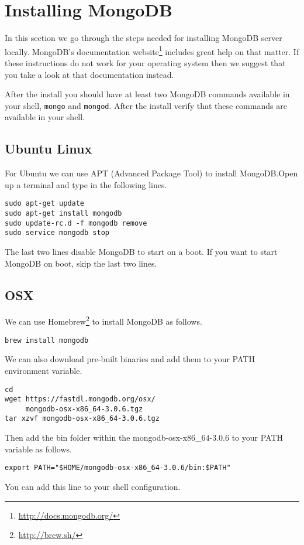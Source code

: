 \section{Installing MongoDB}\label{sec:installing_mongodb}
In this section we go through the steps needed for installing MongoDB server locally. MongoDB's documentation website\footnote{\url{http://docs.mongodb.org/}} includes great help on that matter. If these instructions do not work for your operating system then we suggest that you take a look at that documentation instead.

After the install you should have at least two MongoDB commands available in your shell, \texttt{mongo} and \texttt{mongod}. After the install verify that these commands are available in your shell.

\subsection{Ubuntu Linux}
For Ubuntu we can use APT (Advanced Package Tool) to install MongoDB.Open up a terminal and type in the following lines.

\begin{lstlisting}
sudo apt-get update
sudo apt-get install mongodb
sudo update-rc.d -f mongodb remove
sudo service mongodb stop
\end{lstlisting}

The last two lines disable MongoDB to start on a boot. If you want to start MongoDB on boot, skip the last two lines.

\subsection{OSX}
We can use Homebrew\footnote{\url{http://brew.sh/}} to install MongoDB as follows.

\begin{lstlisting}
brew install mongodb
\end{lstlisting}

We can also download pre-built binaries and add them to your PATH environment variable.
\begin{lstlisting}
cd
wget https://fastdl.mongodb.org/osx/
     mongodb-osx-x86_64-3.0.6.tgz
tar xzvf mongodb-osx-x86_64-3.0.6.tgz
\end{lstlisting}

Then add the bin folder within the mongodb-osx-x86\_64-3.0.6 to your PATH variable as follows.

\begin{lstlisting}
export PATH="$HOME/mongodb-osx-x86_64-3.0.6/bin:$PATH"
\end{lstlisting}

You can add this line to your shell configuration.
